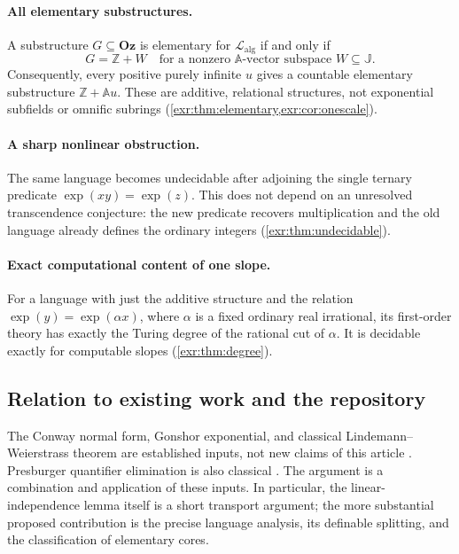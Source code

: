 \documentclass[11pt,letterpaper]{article}
\numberwithin{equation}{section}
\theoremstyle{definition}
\theoremstyle{remark}
\newcommand{\Oz}{\mathbf{Oz}}
\newcommand{\Z}{\mathbb Z}
\newcommand{\A}{\mathbb A}
\newcommand{\J}{\mathbb J}
\newcommand{\Lalg}{\mathcal L_{\mathrm{alg}}}
\begin{document}
\paragraph{All elementary substructures.}
A substructure $G\subseteq\Oz$ is elementary for $\Lalg$ if and only if
\begin{equation}\label{exr:eq:introelementary}
 G=\Z+W\quad\text{for a nonzero $\A$-vector subspace }W\subseteq\J.
\end{equation}
Consequently, every positive purely infinite $u$ gives a countable elementary
substructure $\Z+\A u$. These are additive, relational structures, not exponential
subfields or omnific subrings (\cref{exr:thm:elementary,exr:cor:onescale}).

\paragraph{A sharp nonlinear obstruction.}
The same language becomes undecidable after adjoining the single ternary predicate
$\exp(xy)=\exp(z)$. This does not depend on an unresolved transcendence conjecture:
the new predicate recovers multiplication and the old language already defines
the ordinary integers (\cref{exr:thm:undecidable}).

\paragraph{Exact computational content of one slope.}
For a language with just the additive structure and the relation
$\exp(y)=\exp(\alpha x)$, where $\alpha$ is a fixed ordinary real irrational,
its first-order theory has exactly the Turing degree of the rational cut of
$\alpha$. It is decidable exactly for computable slopes
(\cref{exr:thm:degree}).

\subsection{Relation to existing work and the repository}\label{exr:subsec:provenance}
The Conway normal form, Gonshor exponential, and classical
Lindemann--Weierstrass theorem are established inputs, not new claims of this
article \cite{gonshor,mantova,popescu}. Presburger quantifier elimination is also
classical \cite{cluckers}. The argument is a combination and application of these
inputs. In particular, the linear-independence lemma itself is a short transport
argument; the more substantial proposed contribution is the precise language
analysis, its definable splitting, and the classification of elementary cores.
\end{document}

